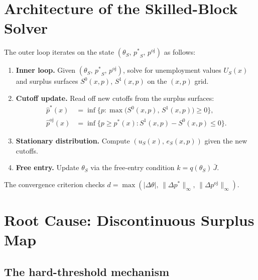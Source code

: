 \documentclass[11pt,a4paper]{article}
\newcommand{\pstar}{\mathord{p^{*}}}
\newcommand{\poj}{\mathord{p^{\mathrm{oj}}}}
\newcommand{\supnorm}[1]{\lVert #1 \rVert_\infty}
\theoremstyle{definition}
\begin{document}
\section{Architecture of the Skilled-Block Solver}

The outer loop iterates on the state $(\theta_S,\, \pstar_S,\, \poj)$ as
follows:

\begin{enumerate}[label=\textbf{(\Alph*)}]
    \item \textbf{Inner loop.}  Given $(\theta_S,\, \pstar_S,\, \poj)$,
          solve for unemployment values $U_S(x)$ and surplus surfaces
          $S^0(x,p)$, $S^1(x,p)$ on the $(x,p)$ grid.

    \item \textbf{Cutoff update.}  Read off new cutoffs from the surplus
          surfaces:
    \begin{align}
        \hat{p}^{*}(x) &= \inf\bigl\{ p :
            \max\bigl(S^0(x,p),\, S^1(x,p)\bigr) \geq 0 \bigr\},
            \label{eq:pstar-def}\\
        \hat{p}^{\mathrm{oj}}(x) &= \inf\bigl\{ p \geq \pstar(x) :
            S^1(x,p) - S^0(x,p) \leq 0 \bigr\}.
            \label{eq:poj-def}
    \end{align}

    \item \textbf{Stationary distribution.}  Compute
          $(u_S(x),\, e_S(x,p))$ given the new cutoffs.

    \item \textbf{Free entry.}  Update $\theta_S$ via the free-entry
          condition $k = q(\theta_S)\, \bar{J}$.
\end{enumerate}

The convergence criterion checks
$d = \max(\lvert\Delta\theta\rvert,\, \supnorm{\Delta \pstar},\,
\supnorm{\Delta \poj})$.


\section{Root Cause: Discontinuous Surplus Map}
\label{sec:root-cause}

\subsection{The hard-threshold mechanism}
\end{document}

